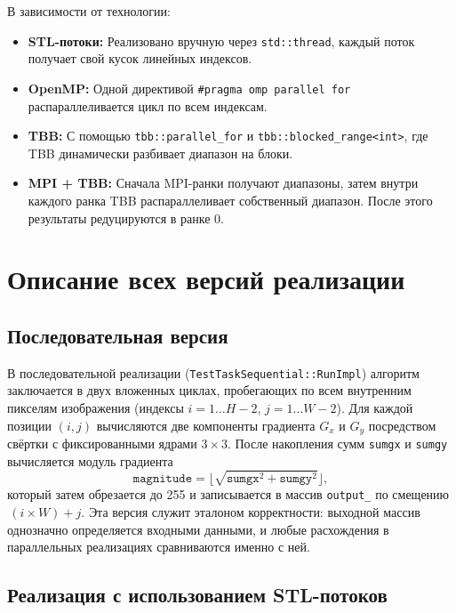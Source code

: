 \documentclass[12pt]{article}
\begin{document}
В зависимости от технологии:
\begin{itemize}
    \item \textbf{STL-потоки:} Реализовано вручную через \texttt{std::thread}, каждый поток получает свой кусок линейных индексов.
    \item \textbf{OpenMP:} Одной директивой \verb|#pragma omp parallel for| распараллеливается цикл по всем индексам.
    \item \textbf{TBB:} С помощью \lstinline[breaklines]{tbb::parallel_for} и \lstinline[breaklines]{tbb::blocked_range<int>}, где TBB динамически разбивает диапазон на блоки.
    \item \textbf{MPI + TBB:} Сначала MPI-ранки получают диапазоны, затем внутри каждого ранка TBB распараллеливает собственный диапазон. После этого результаты редуцируются в ранке 0.
\end{itemize}

\section{Описание всех версий реализации}

\subsection{Последовательная версия}

В последовательной реализации (\texttt{TestTaskSequential::RunImpl}) алгоритм заключается в двух вложенных циклах, пробегающих по всем внутренним пикселям изображения (индексы $i=1\ldots H-2$, $j=1\ldots W-2$). Для каждой позиции $(i,j)$ вычисляются две компоненты градиента $G_x$ и $G_y$ посредством свёртки с фиксированными ядрами $3\times3$. После накопления сумм \texttt{sumgx} и \texttt{sumgy} вычисляется модуль градиента
\[
    \texttt{magnitude} = \lfloor \sqrt{\texttt{sumgx}^2 + \texttt{sumgy}^2} \rfloor,
\]
который затем обрезается до 255 и записывается в массив \texttt{output\_} по смещению \(\,(i \times W) + j\). Эта версия служит эталоном корректности: выходной массив однозначно определяется входными данными, и любые расхождения в параллельных реализациях сравниваются именно с ней.

\subsection{Реализация с использованием STL-потоков}
\end{document}
